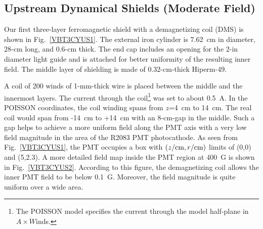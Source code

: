 \documentclass[12pt]{article}
\begin{document}
\subsection{Upstream Dynamical Shields (Moderate Field)}

Our first three-layer ferromagnetic shield with a demagnetizing coil (DMS) is 
shown in Fig.~\ref{VBT3CYUS1}. The external iron cylinder is 7.62~cm in diameter, 
28-cm long, and 0.6-cm thick. The end cap includes an opening for the 2-in diameter 
light guide and is attached for better uniformity of the resulting inner field. The 
middle layer of shielding is made of 0.32-cm-thick Hiperm-49. 

A coil of 200 winds of 1-mm-thick wire is placed between the middle and the innermost 
layers. The current through the coil\footnote{The POISSON model specifies the current 
through the model half-plane in $A\times W$inds.} was set to about 0.5~A. In the 
POISSON coordinates, the coil winding spans from $z$=4~cm to 14~cm. The real coil would 
span from -14~cm to +14~cm with an 8-cm-gap in the middle. Such a gap helps to achieve 
a more uniform field along the PMT axis with a very low field magnitude in the area of 
the R2083 PMT photocathode. As seen from  Fig.~\ref{VBT3CYUS1}, the PMT occupies a box 
with $(z/{\rm cm},r/{\rm cm})$ limits of (0,0) and (5,2.3). A more detailed field map 
inside the PMT region at 400~G is shown in Fig.~\ref{VBT3CYUS2}. According to this 
figure, the demagnetizing coil allows the inner PMT field to be below 0.1~G. 
Moreover, the field magnitude is quite uniform over a wide area.
\end{document}
